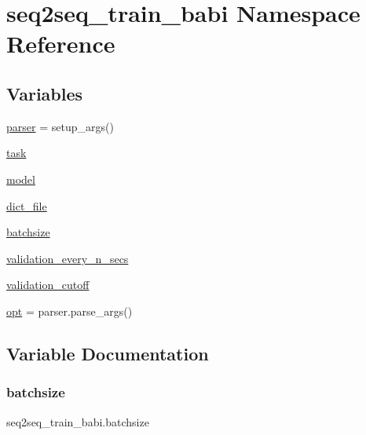\hypertarget{namespaceseq2seq__train__babi}{}\section{seq2seq\+\_\+train\+\_\+babi Namespace Reference}
\label{namespaceseq2seq__train__babi}
\subsection*{Variables}
\begin{DoxyCompactItemize}
\item 
\hyperlink{namespaceseq2seq__train__babi_a115c06fb282df0680f290de2e0cce605}{parser} = setup\+\_\+args()
\item 
\hyperlink{namespaceseq2seq__train__babi_aab701f2ffdd44169d27e821f385efc4d}{task}
\item 
\hyperlink{namespaceseq2seq__train__babi_a9b046813cd6bad230e39e884bd53f2fb}{model}
\item 
\hyperlink{namespaceseq2seq__train__babi_aea4b9f622282ecddd20c817a8a5b54a9}{dict\+\_\+file}
\item 
\hyperlink{namespaceseq2seq__train__babi_a793050eed570d62c050f2b5d09fb854b}{batchsize}
\item 
\hyperlink{namespaceseq2seq__train__babi_a708e61382d7aa58ee7d5fcc5a0dfb499}{validation\+\_\+every\+\_\+n\+\_\+secs}
\item 
\hyperlink{namespaceseq2seq__train__babi_ac50babad62a2fd00ad2617fe1f79d724}{validation\+\_\+cutoff}
\item 
\hyperlink{namespaceseq2seq__train__babi_a9c72abeb00defd44262466a19bc3b72a}{opt} = parser.\+parse\+\_\+args()
\end{DoxyCompactItemize}


\subsection{Variable Documentation}
\mbox{\label{namespaceseq2seq__train__babi_a793050eed570d62c050f2b5d09fb854b}} 
\subsubsection{\texorpdfstring{batchsize}{batchsize}}
{\footnotesize\ttfamily seq2seq\+\_\+train\+\_\+babi.\+batchsize}



